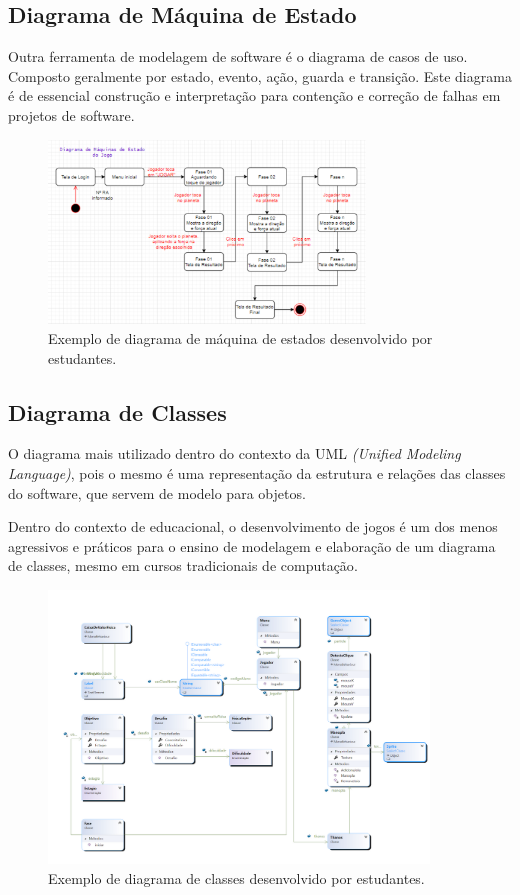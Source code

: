 \documentclass[12pt, onecolumn]{IEEEtran}
\begin{document}
\subsection{Diagrama de Máquina de Estado}

Outra ferramenta de modelagem de software é o diagrama de casos de uso. Composto geralmente por estado, evento, ação, guarda e transição. Este diagrama é de essencial construção e interpretação para contenção e correção de falhas em projetos de software\cite{b28}.

\begin{figure}[H]
    \centering
    \includegraphics[width=0.75\textwidth]{imagens/exemplo-diagrama-de-maquina-de-estado.png}
    \caption{Exemplo de diagrama de máquina de estados desenvolvido por estudantes.}
    \label{fig:mesh1}
\end{figure}

\subsection{Diagrama de Classes}

O diagrama mais utilizado dentro do contexto da UML \textit{(Unified Modeling Language)}, pois o mesmo é uma representação da estrutura e relações das classes do software, que servem de modelo para objetos. 

Dentro do contexto de educacional, o desenvolvimento de jogos é um dos menos agressivos e práticos para o ensino de modelagem e elaboração de um diagrama de classes, mesmo em cursos tradicionais de computação\cite{b29}. 

\begin{figure}[H]
    \centering
    \includegraphics[width=0.9\textwidth]{imagens/exemplo-diagrama-de-classes.png}
    \caption{Exemplo de diagrama de classes desenvolvido por estudantes.}
    \label{fig:mesh1}
\end{figure}
\end{document}
